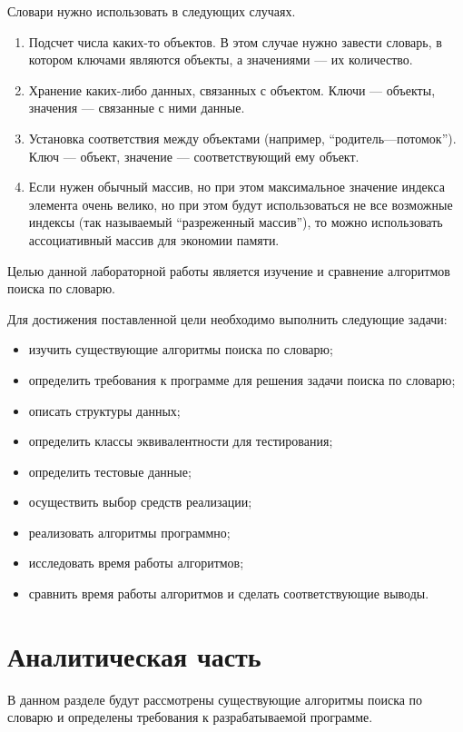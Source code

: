 \documentclass[12pt]{report}
\begin{document}
    Словари нужно использовать в следующих случаях.
    \begin{enumerate}
    	\item Подсчет числа каких-то объектов. В этом случае нужно завести словарь, в котором ключами являются объекты, а значениями — их количество.
    	\item Хранение каких-либо данных, связанных с объектом. Ключи — объекты, значения — связанные с ними данные.
    	\item Установка соответствия между объектами (например, “родитель—потомок”). Ключ — объект, значение — соответствующий ему объект.
    	\item Если нужен обычный массив, но при этом максимальное значение индекса элемента очень велико, но при этом будут использоваться не все возможные индексы (так называемый “разреженный массив”), то можно использовать ассоциативный массив для экономии памяти.
    \end{enumerate}
    
    Целью данной лабораторной работы является изучение и сравнение алгоритмов поиска по словарю.
    
    Для достижения поставленной цели необходимо выполнить следующие задачи:
    
    \begin{itemize}
    	\item изучить существующие алгоритмы поиска по словарю;
    	\item определить требования к программе для решения задачи поиска по словарю;
    	\item описать структуры данных;
    	\item определить классы эквивалентности для тестирования;
    	\item определить тестовые данные;
    	\item осуществить выбор средств реализации;
    	\item реализовать алгоритмы программно;
    	\item исследовать время работы алгоритмов;
    	\item сравнить время работы алгоритмов и сделать соответствующие выводы.
    \end{itemize}
    
    \chapter{Аналитическая часть}
    
    В данном разделе будут рассмотрены существующие алгоритмы поиска по словарю и 
    определены требования к разрабатываемой программе.
    
\end{document}
